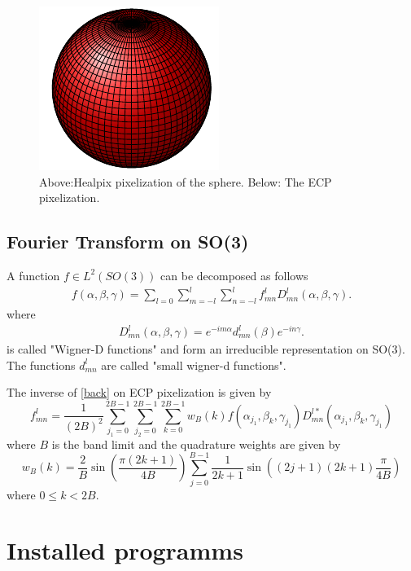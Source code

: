 \documentclass[12pt]{article}
\begin{document}
\begin{figure}[ht]
      \includegraphics[]{cylindrical-f3.pdf}
   \caption{Above:Healpix pixelization of the sphere. Below: The ECP pixelization.}
   \label{healpix}
\end{figure}

\subsection{Fourier Transform on SO(3)}
A function $f \in L^2(SO(3))$ can be decomposed as follows
\begin{eqnarray}
f(\alpha,\beta,\gamma) = \sum_{l = 0}\sum_{m = -l}^l\sum_{n = -l}^l f^l_{mn}D^l_{mn}(\alpha,\beta,\gamma).
\label{back}
\end{eqnarray}
where
\begin{eqnarray}
D^l_{mn}(\alpha,\beta,\gamma) = e^{-im\alpha}d^l_{mn}(\beta)e^{-in\gamma}.
\end{eqnarray}
is called "Wigner-D functions" and form an irreducible representation on SO(3). The
functions $d^l_{mn}$ are called "small wigner-d functions".

The inverse of \ref{back} on ECP pixelization is given by
\begin{equation}
f^l_{mn} = \frac{1}{(2B)^2}\sum_{j_1 = 0}^{2B - 1}\sum_{j_2 = 0}^{2B - 1}\sum_{k = 0}^{2B - 1}
w_B(k)f(\alpha_{j_1},\beta_{k},\gamma_{j_1})D^{l*}_{mn}(\alpha_{j_1},\beta_{k},\gamma_{j_1})
\end{equation}
where $B$ is the band limit and the quadrature weights are given by
\begin{equation}
w_B(k) = \frac{2}{B}\sin\left(\frac{\pi(2k + 1)}{4B}\right)\sum_{j = 0}^{B - 1}
\frac{1}{2k + 1}\sin\left((2j+1)(2k+1)\frac{\pi}{4B}\right)
\end{equation}
where $0\le k < 2B$. 

\section{Installed programms}
\end{document}

